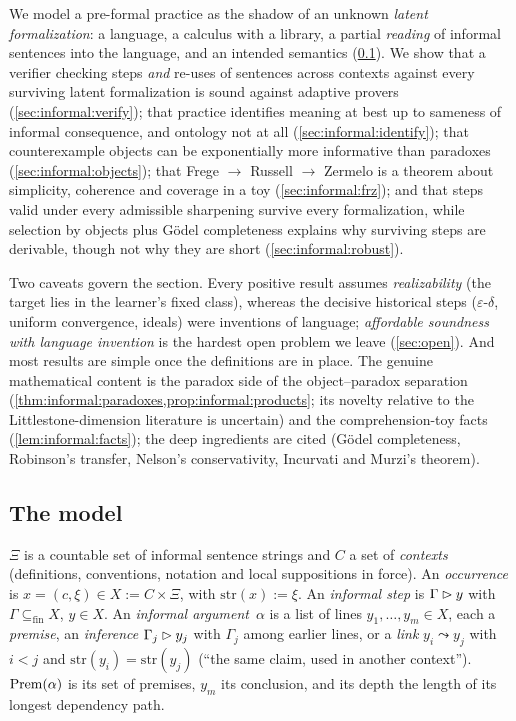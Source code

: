 We model a pre-formal practice as the shadow of an unknown \emph{latent formalization}: a language, a calculus with a library, a partial \emph{reading} of informal sentences into the language, and an intended semantics (\cref{sec:informal:model}). We show that a verifier checking steps \emph{and} re-uses of sentences across contexts against every surviving latent formalization is sound against adaptive provers (\cref{sec:informal:verify}); that practice identifies meaning at best up to sameness of informal consequence, and ontology not at all (\cref{sec:informal:identify}); that counterexample objects can be exponentially more informative than paradoxes (\cref{sec:informal:objects}); that Frege $\to$ Russell $\to$ Zermelo is a theorem about simplicity, coherence and coverage in a toy (\cref{sec:informal:frz}); and that steps valid under every admissible sharpening survive every formalization, while selection by objects plus Gödel completeness explains why surviving steps are derivable, though not why they are short (\cref{sec:informal:robust}).

Two caveats govern the section. Every positive result assumes \emph{realizability} (the target lies in the learner's fixed class), whereas the decisive historical steps ($\varepsilon$-$\delta$, uniform convergence, ideals) were inventions of language; \emph{affordable soundness with language invention} is the hardest open problem we leave (\cref{sec:open}). And most results are simple once the definitions are in place. The genuine mathematical content is the paradox side of the object--paradox separation (\cref{thm:informal:paradoxes,prop:informal:products}; its novelty relative to the Littlestone-dimension literature is uncertain) and the comprehension-toy facts (\cref{lem:informal:facts}); the deep ingredients are cited (Gödel completeness, Robinson's transfer, Nelson's conservativity, Incurvati and Murzi's theorem).

\subsection{The model}\label{sec:informal:model}

\begin{definition}\label{def:informal:arg}
$\Xi$ is a countable set of informal sentence strings and $C$ a set of \emph{contexts} (definitions, conventions, notation and local suppositions in force). An \emph{occurrence} is $x=(c,\xi)\in X:=C\times\Xi$, with $\mathrm{str}(x):=\xi$. An \emph{informal step} is $\Gamma\rhd y$ with $\Gamma\subseteq_{\mathrm{fin}}X$, $y\in X$. An \emph{informal argument}~$\alpha$ is a list of lines $y_1,\dots,y_m\in X$, each a \emph{premise}, an \emph{inference} $\Gamma_j\rhd y_j$ with $\Gamma_j$ among earlier lines, or a \emph{link} $y_i\leadsto y_j$ with $i<j$ and $\mathrm{str}(y_i)=\mathrm{str}(y_j)$ (``the same claim, used in another context''). $\mathrm{Prem}(\alpha)$ is its set of premises, $y_m$ its conclusion, and its depth the length of its longest dependency path.
\end{definition}

